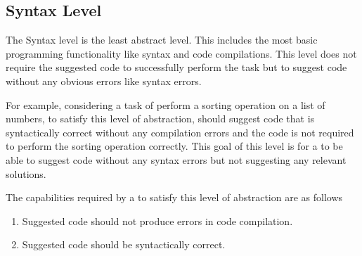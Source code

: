 \subsection{Syntax Level}
\label{syntax}
The Syntax level is the least abstract level. This includes the most basic programming functionality like syntax and code compilations. This level does not require the suggested code to successfully perform the task but to suggest code without any obvious errors like syntax errors.

For example, considering a task of perform a sorting operation on a list of numbers, to satisfy this level of abstraction, \cct{} should suggest code that is syntactically correct without any compilation errors and the code is not required to perform the sorting operation correctly. This goal of this level is for a \cct{} to be able to suggest code without any syntax errors but not suggesting any relevant solutions.

The capabilities required by a \cct{} to satisfy this level of abstraction are as follows
\begin{enumerate}
    \item Suggested code should not produce errors in code compilation.
    \item Suggested code should be syntactically correct.
\end{enumerate}